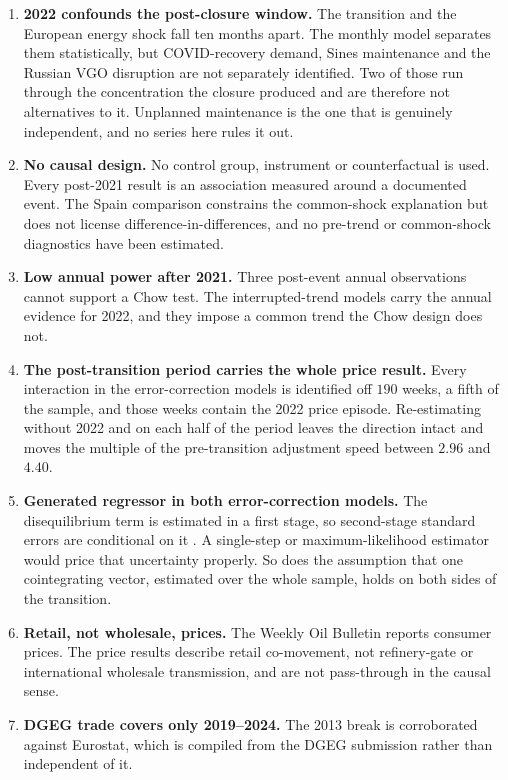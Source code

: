 \documentclass[11pt,a4paper]{article}
\begin{document}
\begin{enumerate}
\item \textbf{2022 confounds the post-closure window.} The transition and the European energy
shock fall ten months apart. The monthly model separates them statistically, but COVID-recovery
demand, Sines maintenance and the Russian VGO disruption are not separately identified. Two of
those run through the concentration the closure produced and are therefore not alternatives to
it. Unplanned maintenance is the one that is genuinely independent, and no series here rules it
out.
\item \textbf{No causal design.} No control group, instrument or counterfactual is used. Every
post-2021 result is an association measured around a documented event. The Spain comparison
constrains the common-shock explanation but does not license difference-in-differences, and no
pre-trend or common-shock diagnostics have been estimated.
\item \textbf{Low annual power after 2021.} Three post-event annual observations cannot support
a Chow test. The interrupted-trend models carry the annual evidence for 2022, and they impose a
common trend the Chow design does not.
\item \textbf{The post-transition period carries the whole price result.} Every interaction
in the error-correction models is identified off $190$ weeks, a fifth of the sample, and those
weeks contain the 2022 price episode. Re-estimating without 2022 and on each half of the
period leaves the direction intact and moves the multiple of the pre-transition adjustment
speed between $2.96$ and $4.40$.
\item \textbf{Generated regressor in both error-correction models.} The disequilibrium term is
estimated in a first stage, so second-stage standard errors are conditional on it
\citep{pagan1984econometric}. A single-step
or maximum-likelihood estimator would price that uncertainty properly. So does the assumption
that one cointegrating vector, estimated over the whole sample, holds on both sides of the
transition.
\item \textbf{Retail, not wholesale, prices.} The Weekly Oil Bulletin reports consumer prices.
The price results describe retail co-movement, not refinery-gate or international wholesale
transmission, and are not pass-through in the causal sense.
\item \textbf{DGEG trade covers only 2019--2024.} The 2013 break is corroborated against
Eurostat, which is compiled from the DGEG submission rather than independent of it.

\end{enumerate}
\end{document}
